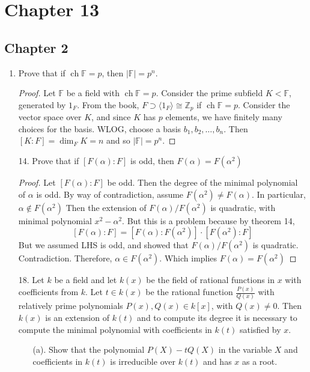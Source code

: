 \documentclass[hidelinks,12pt]{article}
\title{\scalebox{2}{Math 835 Homework 1}}
\author{\scalebox{1.5}{Theo Koss}}
\date{September 2024}
\newcommand{\ch}{\operatorname{ch}}
\newcommand{\Z}{\mathbb{Z}}
\newcommand{\F}{\mathbb{F}}
\begin{document}
\maketitle
\section{Chapter 13}
\subsection{Chapter 2}
\begin{enumerate}
    \item Prove that if $\ch{\F}=p$, then $|\F|=p^n$. \begin{proof}
            Let $\F$ be a field with $\ch{\F}=p$. Consider the prime subfield $K<\F$, generated by $1_F$. From the book, $F\supset\langle1_F\rangle\cong\Z_p$ if $\ch{\F}=p$. Consider the vector space over $K$, and since $K$ has $p$ elements, we have finitely many choices for the basis. WLOG, choose a basis $b_1,b_2,\dots,b_n$. Then $[K:F]=\dim_FK=n$ and so $|\F|=p^n$.
    \end{proof}
\item[14.] Prove that if \([F(\alpha):F]\) is odd, then \(F(\alpha)=F(\alpha^2)\)
    \begin{proof}
        Let \([F(\alpha):F]\) be odd. Then the degree of the minimal polynomial of \(\alpha\) is odd. By way of contradiction, assume \(F(\alpha^2)\neq F(\alpha)\). In particular, \(\alpha\notin F(\alpha^2)\) Then the extension of \(F(\alpha)/F(\alpha^2)\) is quadratic, with minimal polynomial \(x^2-\alpha^2\). But this is a problem because by theorem 14, \[
            [F(\alpha):F]=[F(\alpha):F(\alpha^2)]\cdot[F(\alpha^2):F]
        \]
        But we assumed LHS is odd, and showed that \(F(\alpha)/F(\alpha^2)\) is quadratic. Contradiction. Therefore, \(\alpha\in F(\alpha^2)\). Which implies \(F(\alpha)=F(\alpha^2)\)
    \end{proof}
\item[18.] Let \(k\) be a field and let \(k(x)\) be the field of rational functions in \(x\) with coefficients from \(k\). Let \(t\in k(x)\) be the rational function \(\frac{P(x)}{Q(x)}\) with relatively prime polynomials \(P(x),Q(x)\in k[x]\), with \(Q(x)\neq0\). Then \(k(x)\) is an extension of \(k(t)\) and to compute its degree it is necessary to compute the minimal polynomial with coefficients in \(k(t)\) satisfied by \(x\). 
    \begin{enumerate}
        \item[(a).] Show that the polynomial \(P(X)-tQ(X)\) in the variable \(X\) and coefficients in \(k(t)\) is irreducible over \(k(t)\) and has \(x\) as a root.

\end{enumerate}
\end{enumerate}
\end{document}
